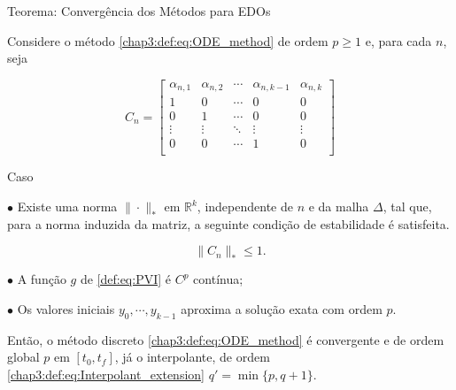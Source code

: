 \documentclass{beamer}
\newcommand{\R}{\mathbb{R}}
\theoremstyle{plain}
\theoremstyle{definition}
\begin{document}
\begin{frame}{Teorema: Convergência dos Métodos para EDOs}

    \scriptsize
    Considere o método \eqref{chap3:def:eq:ODE_method} de ordem $p \geq 1$ e, para cada $n$, seja

    \[
        C_n = 
        \begin{bmatrix}
            \alpha_{n, 1} & \alpha_{n, 2} & \cdots  & \alpha_{n, k - 1} & \alpha_{n, k} \\
            1 & 0 & \cdots & 0 & 0 \\
            0 & 1 & \cdots & 0 & 0 \\
            \vdots & \vdots & \ddots & \vdots & \vdots \\
            0 & 0 & \cdots & 1 & 0 \\
        \end{bmatrix}
    \]

    Caso 

    \phantom{aa} $\bullet$ Existe uma norma $\| \cdot \|_* $ em $\R^k$, independente de $n$ e da malha $\Delta$, tal que, para a norma induzida da matriz, a seguinte condição de estabilidade é satisfeita.

    \begin{equation}
        \| C_n \|_* \leq 1.
        \label{chap3:teo:ODE_methods_convergence:eq:stability_condition}
    \end{equation}

    \phantom{aa} $\bullet$ A função $g$ de \eqref{def:eq:PVI} é $C^p$ contínua;

    \phantom{aa} $\bullet$ Os valores iniciais $y_0, \cdots, y_{k-1}$ aproxima a solução exata com ordem $p$.

    Então, o método discreto \eqref{chap3:def:eq:ODE_method} é convergente e de ordem global $p$ em $[t_0, t_f]$, já o interpolante, de ordem \eqref{chap3:def:eq:Interpolant_extension} $q' = \min\{p, q+1\}$.

\end{frame}


\end{document}
